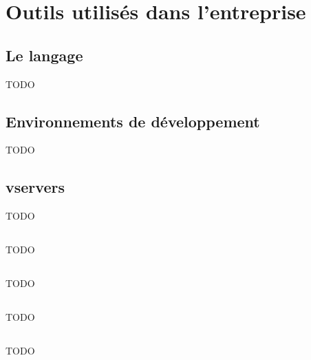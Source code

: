 \section{Outils utilisés dans l'entreprise}

\subsection{Le langage \aphp}

TODO

\subsection{Environnements de développement}

TODO

\subsection{vservers}

TODO

\subsection{\asvn}
\label{section:outils_svn}


TODO

\subsection{\asf}


TODO

\subsection{\adoctrine}

TODO

\subsection{\atrac}
\label{section:outils_trac}

TODO

\subsection{\asismo}
\label{section:sismo}

